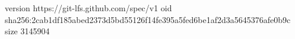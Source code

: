 version https://git-lfs.github.com/spec/v1
oid sha256:2cab1df185abed2373d5bd55126f14fe395a5fed6be1af2d3a5645376afe0b9c
size 3145904

